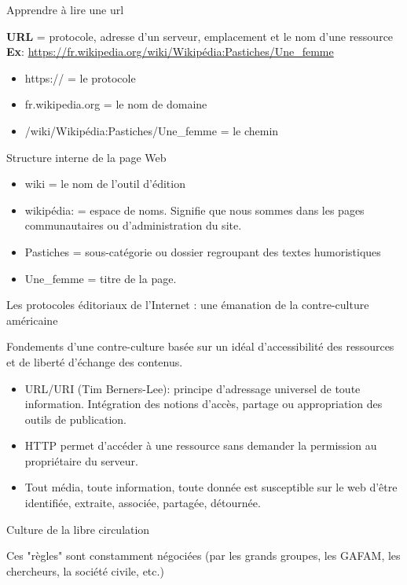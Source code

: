 \begin{frame}{Apprendre à lire une url}
\begin{block}{}
    \textbf{URL} = protocole, adresse d'un serveur, emplacement et le nom d'une ressource \\
    \textbf{Ex}: \url{https://fr.wikipedia.org/wiki/Wikipédia:Pastiches/Une_femme}
\end{block}
\begin{block}{}
    \begin{itemize}
        \item https:// = le protocole
        \item fr.wikipedia.org = le nom de domaine
        \item /wiki/Wikipédia:Pastiches/Une\_femme = le chemin
    \end{itemize}
\end{block}

\begin{block}{Structure interne de la page Web}
    \begin{itemize}
        \item wiki = le nom de l'outil d'édition
        \item wikipédia: = espace de noms. Signifie que nous sommes dans les pages communautaires ou d'administration du site.
        \item Pastiches = sous-catégorie ou dossier regroupant des textes humoristiques
        \item Une\_femme = titre de la page.
    \end{itemize}
\end{block}
    
\end{frame}

\begin{frame}{Les protocoles éditoriaux de l'Internet : une émanation de la contre-culture américaine}

\begin{block}{Fondements d'une contre-culture basée sur un idéal d'accessibilité des ressources et de liberté d'échange des contenus.}
\vspace{1em}
\begin{itemize}
    \item URL/URI (Tim Berners-Lee): principe d'adressage universel de toute information. Intégration des notions d'accès, partage ou appropriation des outils de publication.
    \item HTTP permet d'accéder à une ressource sans demander la permission au propriétaire du serveur.
    \item Tout média, toute information, toute donnée est susceptible sur le web d’être identifiée, extraite, associée, partagée, détournée.
\end{itemize}
    \textrightarrow{}  Culture de la libre circulation
\end{block}

Ces "règles" sont constamment négociées (par les grands groupes, les GAFAM, les chercheurs, la société civile, etc.)

\end{frame}

